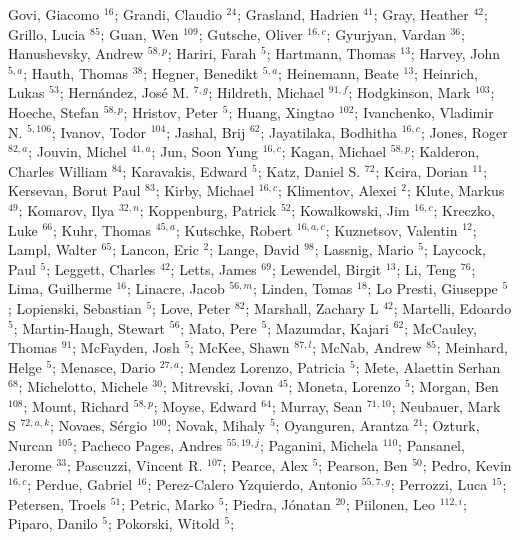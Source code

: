 Govi, Giacomo $^{16}$;
Grandi, Claudio $^{24}$;
Grasland, Hadrien $^{41}$;
Gray, Heather $^{42}$;
Grillo, Lucia $^{85}$;
Guan, Wen $^{109}$;
Gutsche, Oliver $^{16,c}$;
Gyurjyan, Vardan $^{36}$;
Hanushevsky, Andrew $^{58,p}$;
Hariri, Farah $^{5}$;
Hartmann, Thomas $^{13}$;
Harvey, John $^{5,a}$;
Hauth, Thomas $^{38}$;
Hegner, Benedikt $^{5,a}$;
Heinemann, Beate $^{13}$;
Heinrich, Lukas $^{53}$;
Hernández, José M. $^{7,g}$;
Hildreth, Michael $^{91,f}$;
Hodgkinson, Mark $^{103}$;
Hoeche, Stefan $^{58,p}$;
Hristov, Peter $^{5}$;
Huang, Xingtao $^{102}$;
Ivanchenko, Vladimir N. $^{5,106}$;
Ivanov, Todor $^{104}$;
Jashal, Brij $^{62}$;
Jayatilaka, Bodhitha $^{16,c}$;
Jones, Roger $^{82,a}$;
Jouvin, Michel $^{41,a}$;
Jun, Soon Yung $^{16,c}$;
Kagan, Michael $^{58,p}$;
Kalderon, Charles William $^{84}$;
Karavakis, Edward $^{5}$;
Katz, Daniel S. $^{72}$;
Kcira, Dorian $^{11}$;
Kersevan, Borut Paul $^{83}$;
Kirby, Michael $^{16,c}$;
Klimentov, Alexei $^{2}$;
Klute, Markus $^{49}$;
Komarov, Ilya $^{32,n}$;
Koppenburg, Patrick $^{52}$;
Kowalkowski, Jim $^{16,c}$;
Kreczko, Luke $^{66}$;
Kuhr, Thomas $^{45,a}$;
Kutschke, Robert $^{16,a,c}$;
Kuznetsov, Valentin $^{12}$;
Lampl, Walter $^{65}$;
Lancon, Eric $^{2}$;
Lange, David $^{98}$;
Lassnig, Mario $^{5}$;
Laycock, Paul $^{5}$;
Leggett, Charles $^{42}$;
Letts, James $^{69}$;
Lewendel, Birgit $^{13}$;
Li, Teng $^{76}$;
Lima, Guilherme $^{16}$;
Linacre, Jacob $^{56,m}$;
Linden, Tomas $^{18}$;
Lo Presti, Giuseppe $^{5}$;
Lopienski, Sebastian $^{5}$;
Love, Peter $^{82}$;
Marshall, Zachary L $^{42}$;
Martelli, Edoardo $^{5}$;
Martin-Haugh, Stewart $^{56}$;
Mato, Pere $^{5}$;
Mazumdar, Kajari $^{62}$;
McCauley, Thomas $^{91}$;
McFayden, Josh $^{5}$;
McKee, Shawn $^{87,l}$;
McNab, Andrew $^{85}$;
Meinhard, Helge $^{5}$;
Menasce, Dario $^{27,a}$;
Mendez Lorenzo, Patricia $^{5}$;
Mete, Alaettin Serhan $^{68}$;
Michelotto, Michele $^{30}$;
Mitrevski, Jovan $^{45}$;
Moneta, Lorenzo $^{5}$;
Morgan, Ben $^{108}$;
Mount, Richard $^{58,p}$;
Moyse, Edward $^{64}$;
Murray, Sean $^{71,10}$;
Neubauer, Mark S $^{72,a,k}$;
Novaes, Sérgio $^{100}$;
Novak, Mihaly $^{5}$;
Oyanguren, Arantza $^{21}$;
Ozturk, Nurcan $^{105}$;
Pacheco Pages, Andres $^{55,19,j}$;
Paganini, Michela $^{110}$;
Pansanel, Jerome $^{33}$;
Pascuzzi, Vincent R. $^{107}$;
Pearce, Alex $^{5}$;
Pearson, Ben $^{50}$;
Pedro, Kevin $^{16,c}$;
Perdue, Gabriel $^{16}$;
Perez-Calero Yzquierdo, Antonio $^{55,7,g}$;
Perrozzi, Luca $^{15}$;
Petersen, Troels $^{51}$;
Petric, Marko $^{5}$;
Piedra, Jónatan $^{20}$;
Piilonen, Leo $^{112,i}$;
Piparo, Danilo $^{5}$;
Pokorski, Witold $^{5}$;
